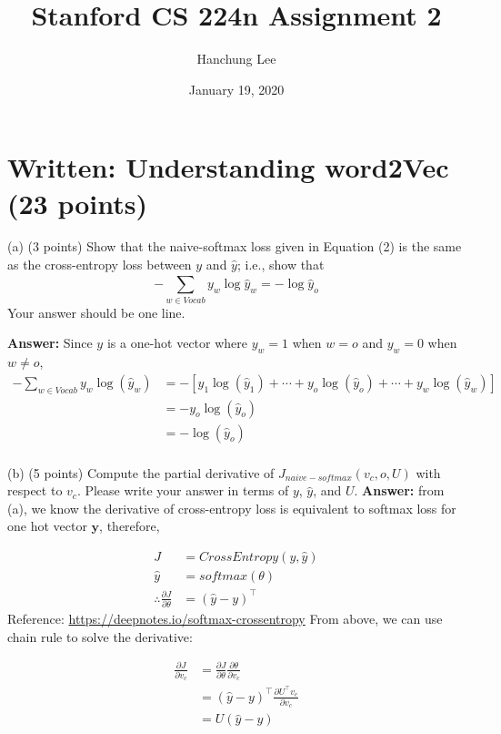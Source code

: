 \documentclass{article}
\title{Stanford CS 224n Assignment 2}
\author{Hanchung Lee}
\date{January 19, 2020}
\begin{document}
\maketitle
\section{Written: Understanding word2Vec (23 points)}
(a) (3 points) Show that the naive-softmax loss given in Equation (2) is the same as the cross-entropy loss
between $y$ and $\hat{y}$; i.e., show that $$-\sum_{w\in{Vocab}}^{} y_w\log{\hat{y}_w} = -\log{\hat{y}_o}$$ 
\indent Your answer should be one line.
\bigbreak

\noindent
\textbf{Answer:} Since $y$ is a one-hot vector where $y_w = 1$ when $w = o$ and $y_w = 0$ when $w \ne o$, 
\begin{align*}
-\sum_{w\in Vocab}y_w\log(\hat{y}_w) & = -[y_1\log(\hat{y}_1) + \cdots + y_o\log(\hat{y}_o) + \cdots + y_w\log(\hat{y}_w)] \\
& = - y_o\log(\hat{y}_o) \\
& = -\log(\hat{y}_o) \\
\end{align*}
\bigbreak

\noindent (b) (5 points) Compute the partial derivative of $J_{naive-softmax}(v_c,o,U)$ with respect to $v_c$.  Please write your answer in terms of $y$, $\hat{y}$, and $U$.
\bigbreak
\textbf{Answer:} from (a), we know the derivative of cross-entropy loss is equivalent to softmax loss for one hot vector $\mathbf{y}$, therefore,  

\begin{align*}
J &= CrossEntropy(y, \hat{y})\\
\hat{y} &= softmax(\theta) \\
\therefore \frac{\partial J}{\partial \theta} &= (\hat{y} - y)^\intercal    
\end{align*}
\indent Reference: \url{https://deepnotes.io/softmax-crossentropy}
\smallbreak
From above, we can use chain rule to solve the derivative:

\begin{align*}
    \frac{\partial J}{\partial v_c} &= \frac{\partial J}{\partial \theta} \frac{\partial \theta}{\partial v_c} \\
    &= (\hat{y} - y)^\intercal \frac{\partial U^\intercal v_c}{\partial v_c} \\
    &= U (\hat{y} - y)
\end{align*}

\smallbreak
\end{document}
